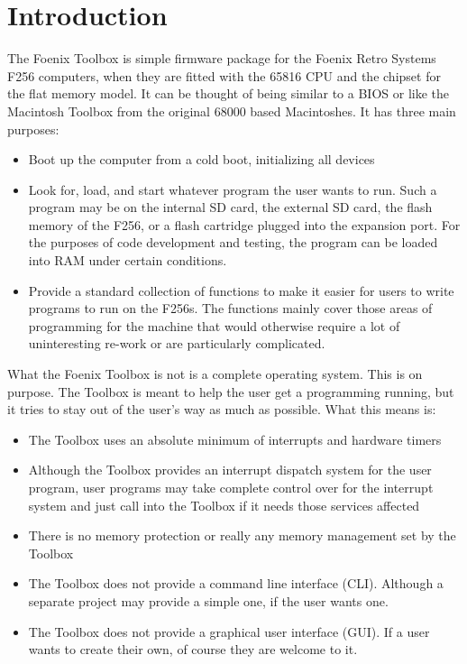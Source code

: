 \chapter{Introduction}

The Foenix Toolbox is simple firmware package for the Foenix Retro Systems F256 computers, when they are fitted with the 65816 CPU and the chipset for the flat memory model. It can be thought of being similar to a BIOS or like the Macintosh Toolbox from the original 68000 based Macintoshes. It has three main purposes:
\begin{itemize}
	\item Boot up the computer from a cold boot, initializing all devices
	\item Look for, load, and start whatever program the user wants to run. Such a program may be on the internal SD card, the external SD card, the flash memory of the F256, or a flash cartridge plugged into the expansion port. For the purposes of code development and testing, the program can be loaded into RAM under certain conditions.
	\item Provide a standard collection of functions to make it easier for users to write programs to run on the F256s. The functions mainly cover those areas of programming for the machine that would otherwise require a lot of uninteresting re-work or are particularly complicated.
\end{itemize}

What the Foenix Toolbox is not is a complete operating system. This is on purpose. The Toolbox is meant to help the user get a programming running, but it tries to stay out of the user's way as much as possible. What this means is:
\begin{itemize}
	\item The Toolbox uses an absolute minimum of interrupts and hardware timers
	\item Although the Toolbox provides an interrupt dispatch system for the user program, user programs may take complete control over for the interrupt system and just call into the Toolbox if it needs those services affected
	\item There is no memory protection or really any memory management set by the Toolbox
	\item The Toolbox does not provide a command line interface (CLI). Although a separate project may provide a simple one, if the user wants one.
	\item The Toolbox does not provide a graphical user interface (GUI). If a user wants to create their own, of course they are welcome to it.
\end{itemize}

